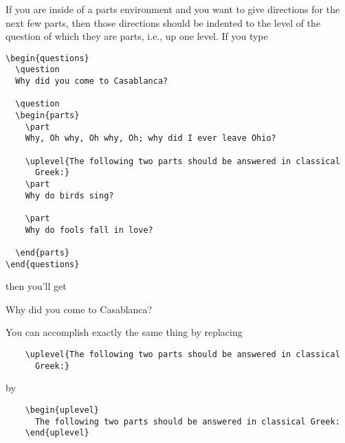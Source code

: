 \documentclass[12pt]{exam}
\begin{document}
If you are inside of a parts environment and you want to give
directions for the next few parts, then those directions should be
indented to the level of the question of which they are parts, i.e.,
up one level.  If you type
\begin{verbatim}
\begin{questions}
  \question
  Why did you come to Casablanca?

  \question
  \begin{parts}
    \part
    Why, Oh why, Oh why, Oh; why did I ever leave Ohio?

    \uplevel{The following two parts should be answered in classical
      Greek:}
    \part
    Why do birds sing?

    \part
    Why do fools fall in love?

  \end{parts}
\end{questions}
\end{verbatim}
then you'll get
\begin{questions}
  \question
  Why did you come to Casablanca?

  \question
\end{questions}
You can accomplish exactly the same thing by replacing
\begin{verbatim}
    \uplevel{The following two parts should be answered in classical
      Greek:}
\end{verbatim}
by
\begin{verbatim}
    \begin{uplevel}
      The following two parts should be answered in classical Greek:
    \end{uplevel}
\end{verbatim}
\end{document}
